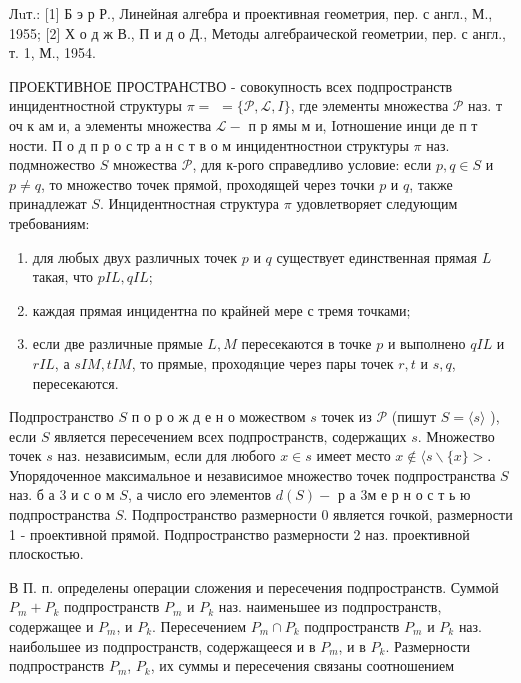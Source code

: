 \documentclass[10pt]{article}
\begin{document}
Лuт.: [1] Б э р Р., Линейная алгебра и проективная геометрия, пер. с англ., М., 1955; [2] Х о д ж В., П и д о Д., Методы алгебраической геометрии, пер. с англ., т. 1, М., 1954.



ПРОЕКТИВНОЕ ПРОСТРАНСТВО - совокупность всех подпространств инцидентностной структуры $\pi=$ $=\{\mathscr{P}, \mathscr{L}, I\}$, где элементы множества $\mathscr{P}$ наз. т оч к ам и, а элементы множества $\mathscr{L}-$ п р ямы м и, Iотношение инци де п т ности. П о д п р о с тр а н с т в о м инцидентностнои структуры $\pi$ наз. подмножество $S$ множества $\mathscr{P}$, для к-рого справедливо условие: если $p, q \in S$ и $p \neq q$, то множество точек прямой, проходящей через точки $p$ и $q$, также принадлежат $S$. Инцидентностная структура $\pi$ удовлетворяет следующим требованиям:



\begin{enumerate}

  \item для любых двух различных точек $p$ и $q$ существует единственная прямая $L$ такая, что $p I L, q I L$;



  \item каждая прямая инцидентна по крайней мере с тремя точками;



  \item если две различные прямые $L, M$ пересекаются в точке $p$ и выполнено $q I L$ и $r I L$, а $s I M, t I M$, то прямые, проходяıцие через пары точек $r, t$ и $s, q$, пересекаются.



\end{enumerate}



Подпространство $S$ п о р о ж д е н о можеством $s$ точек из $\mathscr{P}$ (пишут $S=\langle s\rangle$ ), если $S$ является пересечением всех подпространств, содержащих $s$. Множество точек $s$ наз. независимым, если для любого $x \in s$ имеет место $x \notin\langle s \backslash\{x\}>$. Упорядоченное максимальное и независимое множество точек подпространства $S$ наз. б а 3 и с о м $S$, а число его элементов $d(S)-$ р а 3м е р н о с т ь ю подпространства $S$. Подпространство размерности 0 является гочкой, размерности 1 - проективной прямой. Подпространство размерности 2 наз. проективной плоскостью.



В П. п. определены операции сложения и пересечения подпространств. Суммой $P_{m}+P_{k}$ подпространств $P_{m}$ и $P_{k}$ наз. наименьшее из подпространств, содержащее и $P_{m}$, и $P_{k}$. Пересечением $P_{m} \cap P_{k}$ подпространств $P_{m}$ и $P_{k}$ наз. наибольшее из подпространств, содержащееся и в $P_{m}$, и в $P_{k}$. Размерности подпространств $P_{m}$, $P_{k}$, их суммы и пересечения связаны соотношением
\end{document}
